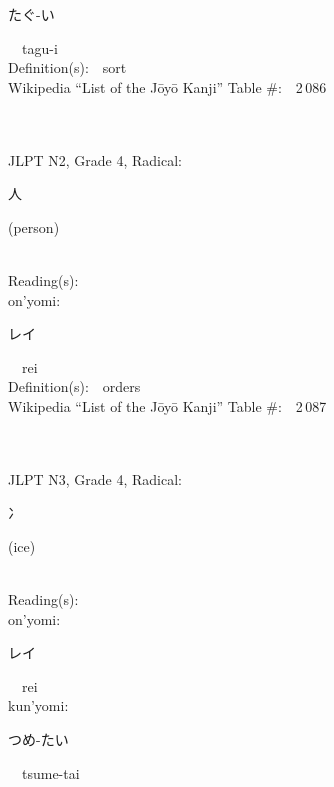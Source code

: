 \begin{multicols}{2}
{\hspace*{2em}}{\begin{CJK}{UTF8}{min} たぐ-い \end{CJK}}\ \ tagu-i\ \ \\
Definition(s):\ \ sort \\
Wikipedia ``List of the J\=oy\=o Kanji'' Table \#:\ \ 2\,086 \\
\ \ \\
{\fontsize{34pt}{40pt}  }\ \ \\  %
{JLPT N2, Grade 4, Radical:\ \ {\begin{CJK}{UTF8}{min} 人 \end{CJK}} (person) } \\
Reading(s):\ \ \\
{\hspace*{1em}}on'yomi:\ \ \\
{\hspace*{2em}}{\begin{CJK}{UTF8}{min} レイ \end{CJK}}\ \ rei\ \ \\
Definition(s):\ \ orders \\
Wikipedia ``List of the J\=oy\=o Kanji'' Table \#:\ \ 2\,087 \\
\ \ \\
{\fontsize{34pt}{40pt}  }\ \ \\  %
{JLPT N3, Grade 4, Radical:\ \ {\begin{CJK}{UTF8}{min} 冫 \end{CJK}} (ice) } \\
Reading(s):\ \ \\
{\hspace*{1em}}on'yomi:\ \ \\
{\hspace*{2em}}{\begin{CJK}{UTF8}{min} レイ \end{CJK}}\ \ rei\ \ \\
{\hspace*{1em}}kun'yomi:\ \ \\
{\hspace*{2em}}{\begin{CJK}{UTF8}{min} つめ-たい \end{CJK}}\ \ tsume-tai\ \ \\

\end{multicols}
